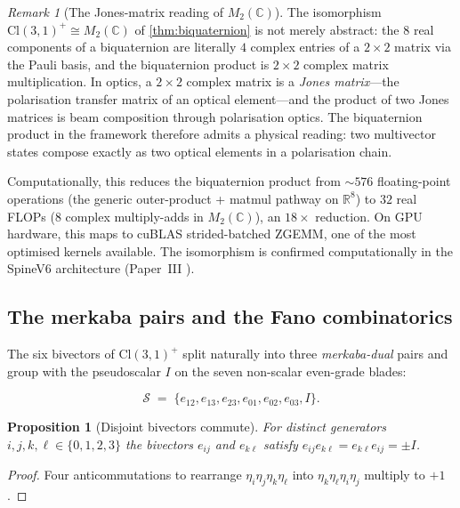 \documentclass[11pt,a4paper]{article}
\theoremstyle{plain}
\newtheorem{proposition}[theorem]{Proposition}
\theoremstyle{definition}
\theoremstyle{remark}
\newtheorem{remark}[theorem]{Remark}
\numberwithin{equation}{section}
\providecommand{\Cl}{\mathrm{Cl}}
\providecommand{\R}{\mathbb{R}}
\providecommand{\C}{\mathbb{C}}
\providecommand{\eb}[1]{e_{#1}}
\begin{document}
\begin{remark}[The Jones-matrix reading of $M_2(\C)$]
\label{rmk:jones-matrix}
The isomorphism $\Cl(3,1)^+ \cong M_2(\C)$ of
\cref{thm:biquaternion} is not merely abstract: the $8$ real
components of a biquaternion are literally $4$ complex entries of
a $2 \times 2$ matrix via the Pauli basis, and the biquaternion
product is $2 \times 2$ complex matrix multiplication.  In optics,
a $2 \times 2$ complex matrix is a \emph{Jones matrix}---the
polarisation transfer matrix of an optical element---and the
product of two Jones matrices is beam composition through
polarisation optics.  The biquaternion product in the framework
therefore admits a physical reading: two multivector states compose
exactly as two optical elements in a polarisation chain.

Computationally, this reduces the biquaternion product from
$\sim 576$ floating-point operations (the generic outer-product +
matmul pathway on $\R^8$) to $32$ real FLOPs ($8$ complex
multiply-adds in $M_2(\C)$), an $18\times$ reduction.  On GPU
hardware, this maps to cuBLAS strided-batched ZGEMM, one of the
most optimised kernels available.  The isomorphism is confirmed
computationally in the SpineV6 architecture
(Paper~III \cite[\S 12]{paper-III-monad}).
\end{remark}

\subsection{The merkaba pairs and the Fano combinatorics}

The six bivectors of $\Cl(3,1)^+$ split naturally into three
\emph{merkaba-dual} pairs and group with the pseudoscalar $I$ on
the seven non-scalar even-grade blades:

\begin{equation}
  \mathcal{S} \;=\; \{\eb{12}, \eb{13}, \eb{23}, \eb{01}, \eb{02},
                       \eb{03}, I\}.
  \label{eq:seven-blades}
\end{equation}

\begin{proposition}[Disjoint bivectors commute]
\label{prop:disjoint-commute}
For distinct generators $i, j, k, \ell \in \{0, 1, 2, 3\}$ the
bivectors $\eb{ij}$ and $\eb{k\ell}$ satisfy
$\eb{ij}\eb{k\ell} = \eb{k\ell}\eb{ij} = \pm I$.
\end{proposition}

\begin{proof}
Four anticommutations to rearrange $\eta_i\eta_j\eta_k\eta_\ell$
into $\eta_k\eta_\ell\eta_i\eta_j$ multiply to $+1$.
\end{proof}
\end{document}
